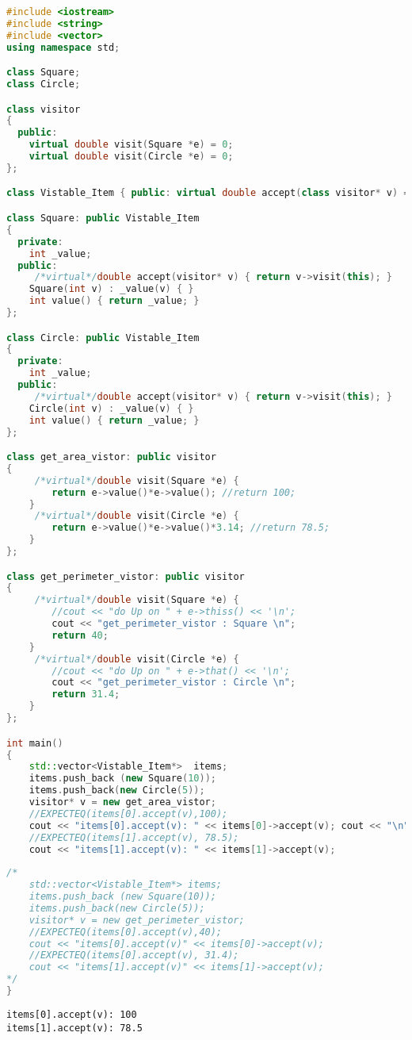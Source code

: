 \documentclass{book}
\begin{document}
\begin{lstlisting}[caption={visitor pattern sample code 5, commandexample.cpp},language=C++]
#include <iostream>
#include <string>
#include <vector>
using namespace std;

class Square;
class Circle;

class visitor
{
  public:
    virtual double visit(Square *e) = 0;
    virtual double visit(Circle *e) = 0;
};

class Vistable_Item { public: virtual double accept(class visitor* v) = 0; };

class Square: public Vistable_Item
{
  private:
    int _value;
  public:
     /*virtual*/double accept(visitor* v) { return v->visit(this); }
    Square(int v) : _value(v) { }
    int value() { return _value; }
};

class Circle: public Vistable_Item
{
  private:
    int _value;
  public:
     /*virtual*/double accept(visitor* v) { return v->visit(this); }
    Circle(int v) : _value(v) { } 
    int value() { return _value; }
};

class get_area_vistor: public visitor
{
     /*virtual*/double visit(Square *e) {
        return e->value()*e->value(); //return 100;
    }
     /*virtual*/double visit(Circle *e) {
        return e->value()*e->value()*3.14; //return 78.5;
    }
};

class get_perimeter_vistor: public visitor
{
     /*virtual*/double visit(Square *e) {
        //cout << "do Up on " + e->thiss() << '\n';
        cout << "get_perimeter_vistor : Square \n";
        return 40;
    }
     /*virtual*/double visit(Circle *e) {
        //cout << "do Up on " + e->that() << '\n';
        cout << "get_perimeter_vistor : Circle \n";
        return 31.4;
    }
};

int main()
{
    std::vector<Vistable_Item*>  items;
    items.push_back (new Square(10));
    items.push_back(new Circle(5));
	visitor* v = new get_area_vistor;
	//EXPECTEQ(items[0].accept(v),100);
	cout << "items[0].accept(v): " << items[0]->accept(v); cout << "\n";
	//EXPECTEQ(items[1].accept(v), 78.5);
	cout << "items[1].accept(v): " << items[1]->accept(v);
	
/*	
	std::vector<Vistable_Item*> items;
	items.push_back (new Square(10));
	items.push_back(new Circle(5));
	visitor* v = new get_perimeter_vistor;
	//EXPECTEQ(items[0].accept(v),40);
	cout << "items[0].accept(v)" << items[0]->accept(v);
	//EXPECTEQ(items[0].accept(v), 31.4);	
	cout << "items[1].accept(v)" << items[1]->accept(v);
*/
}
\end{lstlisting}
\begin{verbatim}
items[0].accept(v): 100
items[1].accept(v): 78.5 
\end{verbatim}
\end{document}
